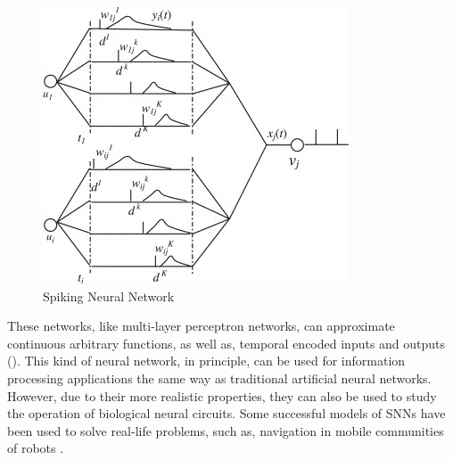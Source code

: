 \begin{figure}[ht]
    \centering
    \includegraphics[scale=4.0]{images/Figure10SNN.png}
    \caption{Spiking Neural Network}
    \label{fig:Spiking Neural Network}
\end{figure}

These networks, like multi-layer perceptron networks, can approximate continuous arbitrary functions, as well as, temporal encoded inputs and outputs (\cite{Maass1996}).  This kind of neural network, in principle, can be used for information processing applications the same way as traditional artificial neural networks. However, due to their more realistic properties, they can also be used to study the operation of biological neural circuits. Some successful models of SNNs have been used to solve real-life problems, such as, navigation in mobile communities of robots \cite{WangHouZou2008}.%

